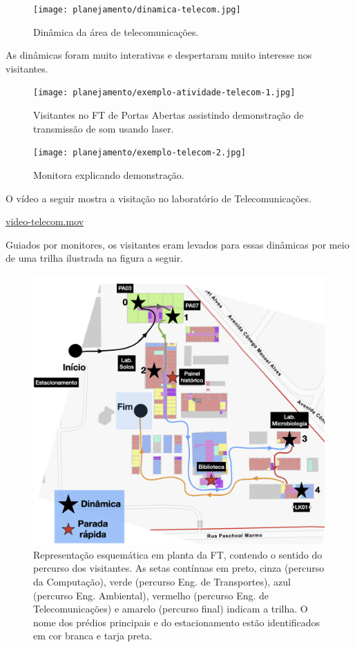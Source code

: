 \documentclass[
  letterpaper,
  DIV=11,
  numbers=noendperiod]{scrreprt}
\begin{document}
\begin{figure}[H]

{\centering \texttt{[image: planejamento/dinamica-telecom.jpg]}

}

\caption{Dinâmica da área de telecomunicações.}

\end{figure}%

As dinâmicas foram muito interativas e despertaram muito interesse nos
visitantes.

\begin{figure}[H]

{\centering \texttt{[image: planejamento/exemplo-atividade-telecom-1.jpg]}

}

\caption{Visitantes no FT de Portas Abertas assistindo demonstração de
transmissão de som usando laser.}

\end{figure}%

\begin{figure}[H]

{\centering \texttt{[image: planejamento/exemplo-telecom-2.jpg]}

}

\caption{Monitora explicando demonstração.}

\end{figure}%

O vídeo a seguir mostra a visitação no laboratório de Telecomunicações.

\url{video-telecom.mov}

Guiados por monitores, os visitantes eram levados para essas dinâmicas
por meio de uma trilha ilustrada na figura a seguir.

\begin{figure}[H]

{\centering \includegraphics[width=0.6\linewidth,height=\textheight,keepaspectratio]{planejamento/percurso-trilhas.png}

}

\caption{Representação esquemática em planta da FT, contendo o sentido
do percurso dos visitantes. As setas contínuas em preto, cinza (percurso
da Computação), verde (percurso Eng. de Transportes), azul (percurso
Eng. Ambiental), vermelho (percurso Eng. de Telecomunicações) e amarelo
(percurso final) indicam a trilha. O nome dos prédios principais e do
estacionamento estão identificados em cor branca e tarja preta.}

\end{figure}%
\end{document}
